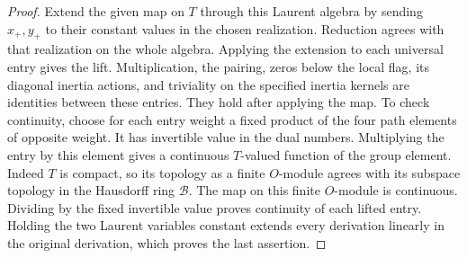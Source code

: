 \documentclass[a4paper,11pt]{article}
\theoremstyle{definition}
\theoremstyle{remark}
\numberwithin{equation}{section}
\begin{document}
\begin{proof}
Extend the given map on \(T\) through this Laurent algebra by
sending \(x_+,y_+\) to their constant values in the chosen
realization. Reduction agrees with that realization on the
whole algebra. Applying the extension to each universal entry
gives the lift. Multiplication, the pairing, zeros below the
local flag, its diagonal inertia actions, and triviality on the
specified inertia kernels are identities between these entries.
They hold after applying the map. To check continuity, choose
for each entry weight a fixed product of the four path elements
of opposite weight. It has invertible value in the dual numbers.
Multiplying the entry by this element gives a continuous
\(T\)-valued function of the group element. Indeed \(T\) is
compact, so its topology as a finite \(O\)-module agrees with
its subspace topology in the Hausdorff ring \(\mathcal B\).
The map on this finite \(O\)-module is continuous. Dividing by
the fixed invertible value proves continuity of each lifted
entry. Holding the two Laurent variables constant extends every
derivation linearly in the original derivation, which proves the
last assertion.
\end{proof}
\end{document}
